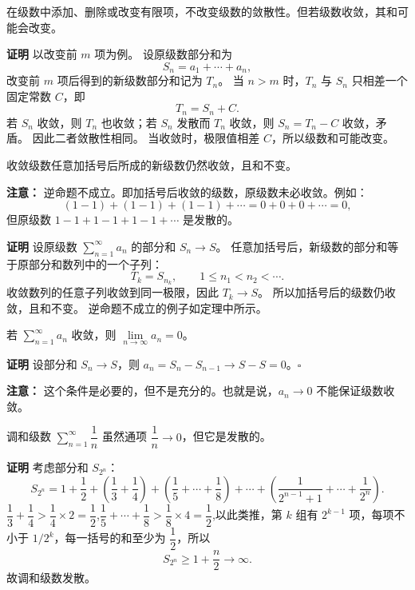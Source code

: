 \documentclass[fontset=fandol]{ctexart}
\newenvironment{custom}[1]{\par\noindent\textbf{#1}\quad}{\par\vspace{0.8em}}
\begin{document}
\begin{property}[添加或删除有限项]
在级数中添加、删除或改变有限项，不改变级数的敛散性。但若级数收敛，其和可能会改变。
\end{property}

\begin{custom}{证明}
以改变前 $m$ 项为例。 设原级数部分和为
\[
S_n=a_1+\cdots+a_n,
\]
改变前 $m$ 项后得到的新级数部分和记为 $T_n$。 当 $n>m$ 时，$T_n$ 与 $S_n$ 只相差一个固定常数 $C$，即
\[
T_n=S_n+C.
\]
若 $S_n$ 收敛，则 $T_n$ 也收敛；若 $S_n$ 发散而 $T_n$ 收敛，则 $S_n=T_n-C$ 收敛，矛盾。 因此二者敛散性相同。 当收敛时，极限值相差 $C$，所以级数和可能改变。
\end{custom}

\begin{property}[加括号]
收敛级数任意加括号后所成的新级数仍然收敛，且和不变。

\textbf{注意：} 逆命题不成立。即加括号后收敛的级数，原级数未必收敛。例如：
\[
(1-1)+(1-1)+(1-1)+\cdots = 0+0+0+\cdots = 0,
\]
但原级数 \(1-1+1-1+1-1+\cdots\) 是发散的。
\end{property}

\begin{custom}{证明}
设原级数 $\sum\limits_{n = 1}^{  \infty } a_n$ 的部分和 $S_n\to S$。 任意加括号后，新级数的部分和等于原部分和数列中的一个子列：
\[
T_k=S_{n_k},\qquad 1\le n_1<n_2<\cdots .
\]
收敛数列的任意子列收敛到同一极限，因此 $T_k\to S$。 所以加括号后的级数仍收敛，且和不变。 逆命题不成立的例子如定理中所示。
\end{custom}



\begin{property}[级数收敛的必要条件]
若 \(\sum\limits_{n = 1}^{  \infty } a_n\) 收敛，则 \(\lim\limits_{n \to \infty} a_n = 0\)。
\end{property}

\begin{custom}{证明}
设部分和 \(S_n \to S\)，则 \(a_n = S_n - S_{n-1} \to S - S = 0\)。\(\square\)
\end{custom}

\textbf{注意：} 这个条件是必要的，但不是充分的。也就是说，\(a_n \to 0\) 不能保证级数收敛。

\begin{example}[调和级数]
调和级数 \(\sum\limits_{n = 1}^{  \infty } \dfrac{1}{n}\) 虽然通项 \(\dfrac{1}{n} \to 0\)，但它是发散的。
\end{example}
\begin{custom}{证明}
考虑部分和 \(S_{2^n}\)：
\[
S_{2^n} = 1 + \dfrac12 + \left(\dfrac13+\dfrac14\right) + \left(\dfrac15+\cdots+\dfrac18\right) + \cdots + \left(\dfrac{1}{2^{n-1}+1} + \cdots + \dfrac{1}{2^n}\right).
\]
$\dfrac13+\dfrac14 > \dfrac14 \times 2 =\dfrac12$,$\dfrac15+\cdots+\dfrac18>\dfrac18 \times 4 =\dfrac12$,以此类推，第 \(k\) 组有 \(2^{k-1}\) 项，每项不小于 \(1/2^k\)，每一括号的和至少为 \(\dfrac12\)，所以
\[
S_{2^n}\geq1+\dfrac n2\to\infty.
\]
故调和级数发散。
\end{custom}
\end{document}
